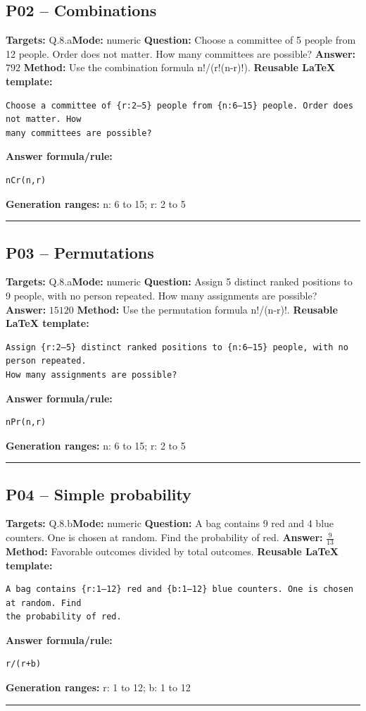 \documentclass[11pt]{article}
\begin{document}
\subsection{P02 -- Combinations}
\textbf{Targets:} Q.8.a\quad\textbf{Mode:} numeric
\textbf{Question:} Choose a committee of 5 people from 12 people. Order does not matter. How many committees are possible?
\textbf{Answer:} \(792\)
\textbf{Method:} Use the combination formula n!/(r!(n-r)!).
\textbf{Reusable LaTeX template:}
\begin{verbatim}
Choose a committee of {r:2–5} people from {n:6–15} people. Order does not matter. How
many committees are possible?
\end{verbatim}
\textbf{Answer formula/rule:}
\begin{verbatim}
nCr(n,r)
\end{verbatim}
\textbf{Generation ranges:} n: 6 to 15; r: 2 to 5
\medskip\hrule\medskip
\subsection{P03 -- Permutations}
\textbf{Targets:} Q.8.a\quad\textbf{Mode:} numeric
\textbf{Question:} Assign 5 distinct ranked positions to 9 people, with no person repeated. How many assignments are possible?
\textbf{Answer:} \(15120\)
\textbf{Method:} Use the permutation formula n!/(n-r)!.
\textbf{Reusable LaTeX template:}
\begin{verbatim}
Assign {r:2–5} distinct ranked positions to {n:6–15} people, with no person repeated.
How many assignments are possible?
\end{verbatim}
\textbf{Answer formula/rule:}
\begin{verbatim}
nPr(n,r)
\end{verbatim}
\textbf{Generation ranges:} n: 6 to 15; r: 2 to 5
\medskip\hrule\medskip
\subsection{P04 -- Simple probability}
\textbf{Targets:} Q.8.b\quad\textbf{Mode:} numeric
\textbf{Question:} A bag contains 9 red and 4 blue counters. One is chosen at random. Find the probability of red.
\textbf{Answer:} \(\frac{9}{13}\)
\textbf{Method:} Favorable outcomes divided by total outcomes.
\textbf{Reusable LaTeX template:}
\begin{verbatim}
A bag contains {r:1–12} red and {b:1–12} blue counters. One is chosen at random. Find
the probability of red.
\end{verbatim}
\textbf{Answer formula/rule:}
\begin{verbatim}
r/(r+b)
\end{verbatim}
\textbf{Generation ranges:} r: 1 to 12; b: 1 to 12
\medskip\hrule\medskip
\end{document}
